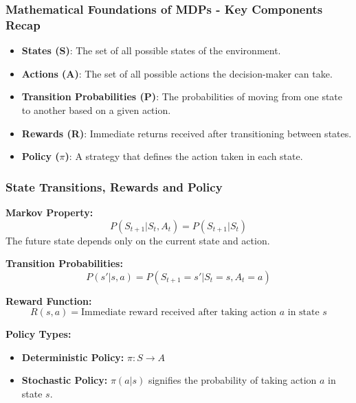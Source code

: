 \documentclass{beamer}
\begin{document}
\begin{frame}[fragile]
    \frametitle{Mathematical Foundations of MDPs - Key Components Recap}
    \begin{itemize}
        \item \textbf{States (S)}: The set of all possible states of the environment.
        \item \textbf{Actions (A)}: The set of all possible actions the decision-maker can take.
        \item \textbf{Transition Probabilities (P)}: The probabilities of moving from one state to another based on a given action.
        \item \textbf{Rewards (R)}: Immediate returns received after transitioning between states.
        \item \textbf{Policy ($\pi$)}: A strategy that defines the action taken in each state.
    \end{itemize}
\end{frame}

\begin{frame}[fragile]
    \frametitle{State Transitions, Rewards and Policy}
    \textbf{Markov Property:}
    \begin{equation}
        P(S_{t+1} | S_t, A_t) = P(S_{t+1} | S_t)
    \end{equation}
    The future state depends only on the current state and action.

    \textbf{Transition Probabilities:}
    \begin{equation}
        P(s' | s, a) = P(S_{t+1} = s' | S_t = s, A_t = a)
    \end{equation}

    \textbf{Reward Function:}
    \begin{equation}
        R(s, a) = \text{Immediate reward received after taking action } a \text{ in state } s
    \end{equation}
    
    \textbf{Policy Types:}
    \begin{itemize}
        \item \textbf{Deterministic Policy:} $\pi: S \rightarrow A$
        \item \textbf{Stochastic Policy:} $\pi(a|s)$ signifies the probability of taking action $a$ in state $s$.
    \end{itemize}
\end{frame}
\end{document}
